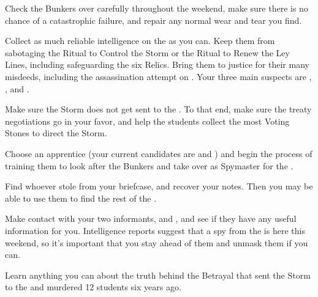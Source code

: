 \documentclass[char]{GL2020}
\begin{document}
\begin{itemz}
    \item Check the Bunkers over carefully throughout the weekend, make sure there is no chance of a catastrophic failure, and repair any normal wear and tear you find.
    \item Collect as much reliable intelligence on the \pGoaties{} as you can. Keep them from sabotaging the Ritual to Control the Storm or the Ritual to Renew the Ley Lines, including safeguarding the six Relics. Bring them to justice for their many misdeeds, including the assassination attempt on \cHeadDiplomat{}. Your three main suspects are \cChupLeader{}, \cJuniorStatesman{}, and \cEbbPriest{}.
    \item Make sure the Storm does not get sent to the \pShip{}. To that end, make sure the treaty negotiations go in your favor, and help the \pShippie{} students collect the most Voting Stones to direct the Storm.
    \item Choose an apprentice (your current candidates are \cTechStar{} and \cInitiate{}) and begin the process of training them to look after the Bunkers and take over as Spymaster for the \pShippies{}.
    \item Find whoever stole \iFolderOfNotes{} from your briefcase, and recover your notes. Then you may be able to use them to find the rest of the \pGoaties{}.
    \item Make contact with your two informants, \cEthics{} and \cAssistantScientist{}, and see if they have any useful information for you. Intelligence reports suggest that a spy from the \pFarm{} is here this weekend, so it's important that you stay ahead of them and unmask them if you can.
    \item Learn anything you can about the truth behind the Betrayal that sent the Storm to the \pShip{} and murdered 12 students six years ago.
\end{itemz}
\end{document}
